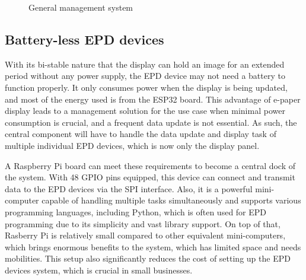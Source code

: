 \documentclass[../Main.tex]{subfiles}
\begin{document}
\begin{figure}[H]
    \centering
    {\fontsize{7pt}{8pt}\selectfont 
    }
    \caption{General management system}
    \label{fig:flow-chart3}
\end{figure}

\subsection{Battery-less \gls{EPD} devices}
With its bi-stable nature that the display can hold an image for an extended period without any power supply, the \gls{EPD} device may not need a battery to function properly. It only consumes power when the display is being updated, and most of the energy used is from the ESP32 board. This advantage of e-paper display leads to a management solution for the use case when minimal power consumption is crucial, and a frequent data update is not essential. As such, the central component will have to handle the data update and display task of multiple individual \gls{EPD} devices, which is now only the display panel.

A Raspberry Pi board can meet these requirements to become a central dock of the system. With 48 GPIO pins equipped, this device can connect and transmit data to the \gls{EPD} devices via the SPI interface. Also, it is a powerful mini-computer capable of handling multiple tasks simultaneously and supports various programming languages, including Python, which is often used for \gls{EPD} programming due to its simplicity and vast library support. On top of that, Rasberry Pi is relatively small compared to other equivalent mini-computers, which brings enormous benefits to the system, which has limited space and needs mobilities. This setup also significantly reduces the cost of setting up the \gls{EPD} devices system, which is crucial in small businesses.
\end{document}
